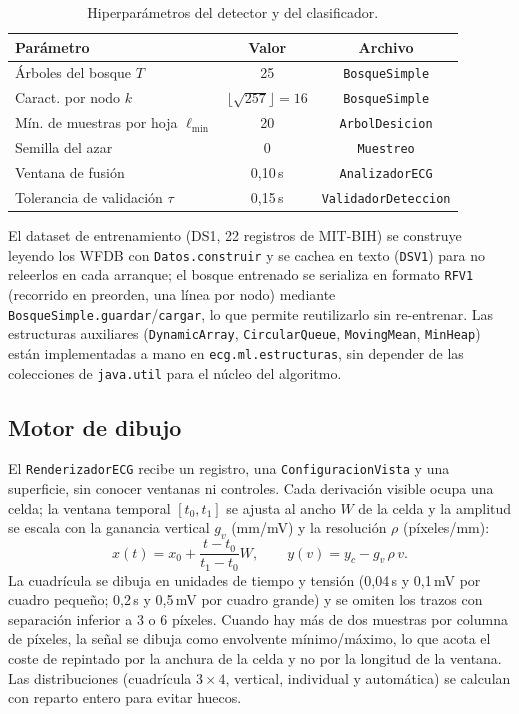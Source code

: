 \begin{table}[H]
\centering
\footnotesize
\setlength{\tabcolsep}{3pt}
\begin{tabular}{@{}lcc@{}}
\toprule
Parámetro & Valor & Archivo \\
\midrule
Árboles del bosque $T$ & 25 & \texttt{Bosque\-Simple} \\
Caract. por nodo $k$ & $\lfloor\sqrt{257}\rfloor{=}16$ & \texttt{Bosque\-Simple} \\
Mín. de muestras por hoja $\ell_{\min}$ & 20 & \texttt{Arbol\-Desicion} \\
Semilla del azar & 0 & \texttt{Muestreo} \\
Ventana de fusión & 0,10\,s & \texttt{Analizador\-ECG} \\
Tolerancia de validación $\tau$ & 0,15\,s & \texttt{Validador\-Deteccion} \\
\bottomrule
\end{tabular}
\caption{Hiperparámetros del detector y del clasificador.}
\label{tab:parametros}
\end{table}

El dataset de entrenamiento (DS1, 22 registros de MIT-BIH) se construye leyendo los WFDB con \texttt{Datos.construir} y se cachea en texto (\texttt{DSV1}) para no releerlos en cada arranque; el bosque entrenado se serializa en formato \texttt{RFV1} (recorrido en preorden, una línea por nodo) mediante \texttt{BosqueSimple.guardar}/\texttt{cargar}, lo que permite reutilizarlo sin re-entrenar. Las estructuras auxiliares (\texttt{DynamicArray}, \texttt{CircularQueue}, \texttt{MovingMean}, \texttt{MinHeap}) están implementadas a mano en \texttt{ecg.ml.estructuras}, sin depender de las colecciones de \texttt{java.util} para el núcleo del algoritmo.



\subsection{Motor de dibujo}
El \texttt{RenderizadorECG} recibe un registro, una \texttt{ConfiguracionVista} y una superficie, sin conocer ventanas ni controles. Cada derivación visible ocupa una celda; la ventana temporal $[t_0,t_1]$ se ajusta al ancho $W$ de la celda y la amplitud se escala con la ganancia vertical $g_v$ (mm/mV) y la resolución $\rho$ (píxeles/mm):
\begin{equation}
x(t)=x_0+\frac{t-t_0}{t_1-t_0}W,\qquad
y(v)=y_c-g_v\,\rho\,v .
\end{equation}
La cuadrícula se dibuja en unidades de tiempo y tensión (0,04\,s y 0,1\,mV por cuadro pequeño; 0,2\,s y 0,5\,mV por cuadro grande) y se omiten los trazos con separación inferior a 3 o 6 píxeles. Cuando hay más de dos muestras por columna de píxeles, la señal se dibuja como envolvente mínimo/máximo, lo que acota el coste de repintado por la anchura de la celda y no por la longitud de la ventana. Las distribuciones (cuadrícula $3\times4$, vertical, individual y automática) se calculan con reparto entero para evitar huecos.

